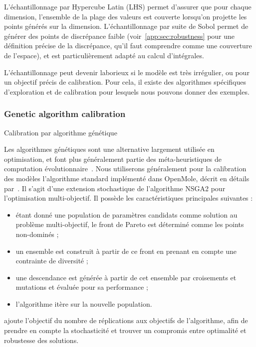 L'échantillonnage par Hypercube Latin (LHS) permet d'assurer que pour chaque dimension, l'ensemble de la plage des valeurs est couverte lorsqu'on projette les points générés sur la dimension. L'échantillonnage par suite de Sobol permet de générer des points de discrépance faible (voir~\ref{app:sec:robustness} pour une définition précise de la discrépance, qu'il faut comprendre comme une couverture de l'espace), et est particulièrement adapté au calcul d'intégrales.


L'échantillonnage peut devenir laborieux si le modèle est très irrégulier, ou pour un objectif précis de calibration. Pour cela, il existe des algorithmes spécifiques d'exploration et de calibration pour lesquels nous pouvons donner des exemples.

\subsubsection*{Genetic algorithm calibration}{Calibration par algorithme génétique}

Les algorithmes génétiques sont une alternative largement utilisée en optimisation, et font plus généralement partie des méta-heuristiques de computation évolutionnaire~\cite{rey2015plateforme}. Nous utiliserons généralement pour la calibration des modèles l'algorithme standard implémenté dans OpenMole, décrit en détails par~\cite{pumain2017evaluation}. Il s'agit d'une extension stochastique de l'algorithme NSGA2 pour l'optimisation multi-objectif. Il possède les caractéristiques principales suivantes :
\begin{itemize}
	\item étant donné une population de paramètres candidats comme solution au problème multi-objectif, le front de Pareto est déterminé comme les points non-dominés ;
	\item un ensemble est construit à partir de ce front en prenant en compte une contrainte de diversité ;
	\item une descendance est générée à partir de cet ensemble par croisements et mutations et évaluée pour sa performance ;
	\item l'algorithme itère sur la nouvelle population.
\end{itemize}

\cite{pumain2017evaluation} ajoute l'objectif du nombre de réplications aux objectifs de l'algorithme, afin de prendre en compte la stochasticité et trouver un compromis entre optimalité et robustesse des solutions.


